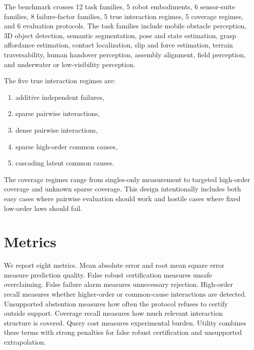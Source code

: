 \documentclass{article}
\begin{document}
\begin{table}[t]
\centering
\caption{Full-scale benchmark size. The CSV stores compact rows; each row represents repeated policy/perception evaluations and frame decisions.}
\label{tab:scale}

\end{table}

The benchmark crosses 12 task families, 5 robot embodiments, 6 sensor-suite families, 8 failure-factor families, 5 true interaction regimes, 5 coverage regimes, and 6 evaluation protocols. The task families include mobile obstacle perception, 3D object detection, semantic segmentation, pose and state estimation, grasp affordance estimation, contact localization, slip and force estimation, terrain traversability, human handover perception, assembly alignment, field perception, and underwater or low-visibility perception.

The five true interaction regimes are:
\begin{enumerate}[leftmargin=1.5em,itemsep=0.25em]
    \item additive independent failures,
    \item sparse pairwise interactions,
    \item dense pairwise interactions,
    \item sparse high-order common causes,
    \item cascading latent common causes.
\end{enumerate}
The coverage regimes range from singles-only measurement to targeted high-order coverage and unknown sparse coverage. This design intentionally includes both easy cases where pairwise evaluation should work and hostile cases where fixed low-order laws should fail.

\section{Metrics}

We report eight metrics. Mean absolute error and root mean square error measure prediction quality. False robust certification measures unsafe overclaiming. False failure alarm measures unnecessary rejection. High-order recall measures whether higher-order or common-cause interactions are detected. Unsupported abstention measures how often the protocol refuses to certify outside support. Coverage recall measures how much relevant interaction structure is covered. Query cost measures experimental burden. Utility combines these terms with strong penalties for false robust certification and unsupported extrapolation.
\end{document}
